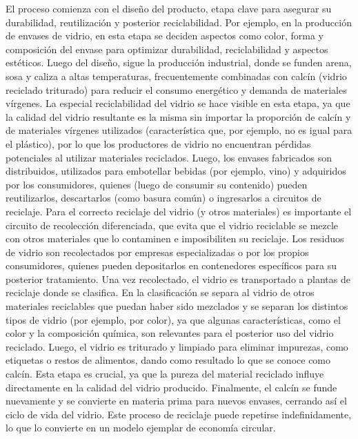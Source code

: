 El proceso comienza con el diseño del producto, etapa clave para asegurar su durabilidad, reutilización y posterior reciclabilidad. Por ejemplo, en la producción de envases de vidrio, en esta etapa se deciden aspectos como color, forma y composición del envase para optimizar durabilidad, reciclabilidad y aspectos estéticos. Luego del diseño, sigue la producción industrial, donde se funden arena, sosa y caliza a altas temperaturas, frecuentemente combinadas con calcín (vidrio reciclado triturado) para reducir el consumo energético y demanda de materiales vírgenes. La especial reciclabilidad del vidrio se hace visible en esta etapa, ya que la calidad del vidrio resultante es la misma sin importar la proporción de calcín y de materiales vírgenes utilizados (característica que, por ejemplo, no es igual para el plástico), por lo que los productores de vidrio no encuentran pérdidas potenciales al utilizar materiales reciclados. Luego, los envases fabricados son distribuidos, utilizados para embotellar bebidas (por ejemplo, vino) y adquiridos por los consumidores, quienes (luego de consumir su contenido) pueden reutilizarlos, descartarlos (como basura común) o ingresarlos a circuitos de reciclaje. Para el correcto reciclaje del vidrio (y otros materiales) es importante el circuito de recolección diferenciada, que evita que el vidrio reciclable se mezcle con otros materiales que lo contaminen e imposibiliten su reciclaje. Los residuos de vidrio son recolectados por empresas especializadas o por los propios consumidores, quienes pueden depositarlos en contenedores específicos para su posterior tratamiento.
Una vez recolectado, el vidrio es transportado a plantas de reciclaje donde se clasifica. En la clasificación se separa al vidrio de otros materiales reciclables que puedan haber sido mezclados y se separan los distintos tipos de vidrio (por ejemplo, por color), ya que algunas características, como el color y la composición química, son relevantes para el posterior uso del vidrio reciclado. Luego, el vidrio es triturado y limpiado para eliminar impurezas, como etiquetas o restos de alimentos, dando como resultado lo que se conoce como calcín. Esta etapa es crucial, ya que la pureza del material reciclado influye directamente en la calidad del vidrio producido. Finalmente, el calcín se funde nuevamente y se convierte en materia prima para nuevos envases, cerrando así el ciclo de vida del vidrio. Este proceso de reciclaje puede repetirse indefinidamente, lo que lo convierte en un modelo ejemplar de economía circular.

